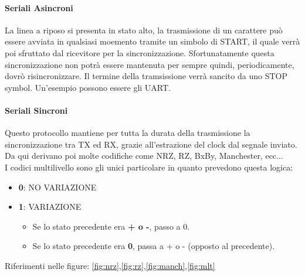 \documentclass[12pt]{article}
\begin{document}
\paragraph{Seriali Asincroni} La linea a riposo si presenta in stato alto, la trasmissione di un carattere può essere avviata in qualsiasi moemento tramite un simbolo di START, il quale verrà poi sfruttato dal ricevitore per la sincronizzazione. Sfortunatamente questa sincronizzazione non potrà essere mantenuta per sempre quindi, periodicamente, dovrò risincronizzare. Il termine della tramsissione verrà sancito da uno STOP symbol. Un'esempio possono essere gli UART.

\paragraph{Seriali Sincroni} Questo protocollo mantiene per tutta la durata della trasmissione la sincronizzazione tra TX ed RX, grazie all'estrazione del clock dal segnale inviato. Da qui derivano poi molte codifiche come NRZ, RZ, BxBy, Manchester, ecc...\\
I codici multilivello sono gli unici particolare in quanto prevedono questa logica:
\begin{itemize}
  \item \textbf{0}: NO VARIAZIONE
  \item \textbf{1}: VARIAZIONE
  \begin{itemize}
    \item Se lo stato precedente era \textbf{+ o -}, passo a 0.
    \item Se lo stato precedente era \textbf{0}, passa a + o - (opposto al precedente).
  \end{itemize}
\end{itemize}
Riferimenti nelle figure: \ref{fig:nrz},\ref{fig:rz},\ref{fig:manch},\ref{fig:mlt}
\end{document}
